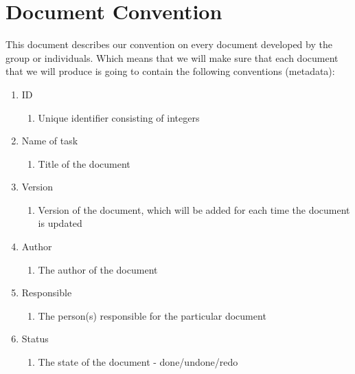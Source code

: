 \renewcommand{\headrulewidth}{0.1pt}
\renewcommand{\footrulewidth}{0.1pt}

\section*{Document Convention}

This document describes our convention on every document developed by the group or individuals. Which means that we will make sure that each document that we will produce is going to contain the following conventions (metadata):

\begin{enumerate}
	\item ID
	\begin{enumerate}
		\item Unique identifier consisting of integers
	\end{enumerate}
	
	\item Name of task
	\begin{enumerate}
		\item Title of the document
	\end{enumerate}

	\item Version
	\begin{enumerate}
		\item Version of the document, which will be added for each time the document is updated
	\end{enumerate}

	\item Author
	\begin{enumerate}
		\item The author of the document
	\end{enumerate}

	\item Responsible
	\begin{enumerate}
		\item The person(s)  responsible for the particular document
	\end{enumerate}
	
	\item Status
	\begin{enumerate}
		\item The state of the document - done/undone/redo
	\end{enumerate}
\end{enumerate}